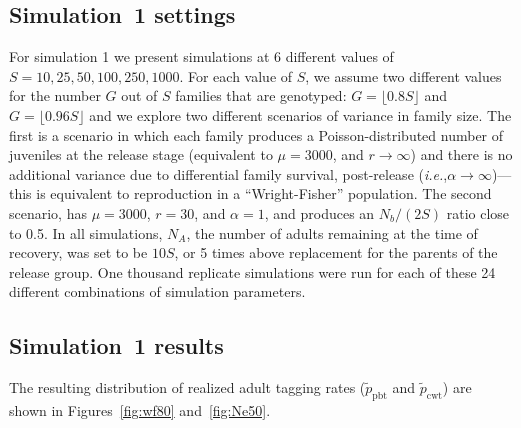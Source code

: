 \documentclass[11pt]{article}
\newcommand{\ie}{{\em i.e.},\xspace }
\begin{document}
\subsection{Simulation~1 settings}
For simulation 1 we present simulations at 6 different values of $S = 10, 25, 50, 100, 250, 1000$.  For each value of $S$,
we assume two different values for the number $G$ out of $S$ families that are genotyped: $G = \lfloor 0.8 S \rfloor$ and
$G = \lfloor 0.96 S \rfloor$ and 
we explore two different scenarios of variance in family size. The first is a scenario in which each family
produces a Poisson-distributed number of
juveniles at the release stage (equivalent to $\mu=3000$, and $r\rightarrow\infty$) and there is no
additional variance due to differential family 
survival, post-release (\ie $\alpha \rightarrow \infty$)---this is equivalent to reproduction in
a ``Wright-Fisher'' population. The second scenario, has
$\mu = 3000$, $r = 30$, and $\alpha = 1$, and produces an $N_b/(2S)$ ratio close to
0.5.  In all simulations, $N_A$, the number of adults remaining at the time of recovery, was set to 
be $10S$, or 5 times above replacement for the parents of the release group. One thousand replicate simulations were run for each of these 24 different combinations of simulation parameters. 

\subsection{Simulation~1 results}The resulting distribution of realized adult tagging
rates ($\tilde{p}_\mathrm{pbt}$ and $\tilde{p}_\mathrm{cwt}$)
are shown in Figures~\ref{fig:wf80} and~\ref{fig:Ne50}.
\end{document}
